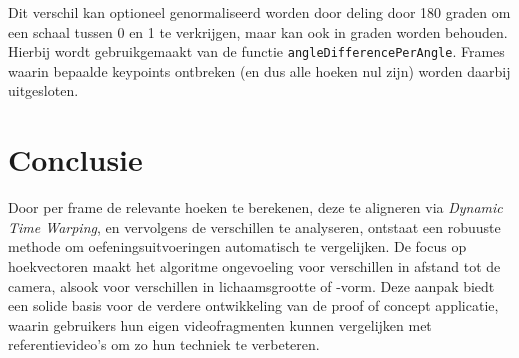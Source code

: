 Dit verschil kan optioneel genormaliseerd worden door deling door 180 graden om een schaal tussen 0 en 1 te verkrijgen, maar kan ook in graden worden behouden. 
Hierbij wordt gebruikgemaakt van de functie \texttt{angleDifferencePerAngle}. Frames waarin bepaalde keypoints ontbreken (en dus alle hoeken nul zijn) worden daarbij uitgesloten.


\section{Conclusie}
Door per frame de relevante hoeken te berekenen, deze te aligneren via \textit{Dynamic Time Warping}, en vervolgens de verschillen te analyseren, ontstaat een robuuste methode om oefeningsuitvoeringen automatisch te vergelijken. 
De focus op hoekvectoren maakt het algoritme ongevoeling voor verschillen in afstand tot de camera, alsook voor verschillen in lichaamsgrootte of -vorm.
Deze aanpak biedt een solide basis voor de verdere ontwikkeling van de proof of concept applicatie, waarin gebruikers hun eigen videofragmenten kunnen vergelijken met referentievideo's om zo hun techniek te verbeteren.

